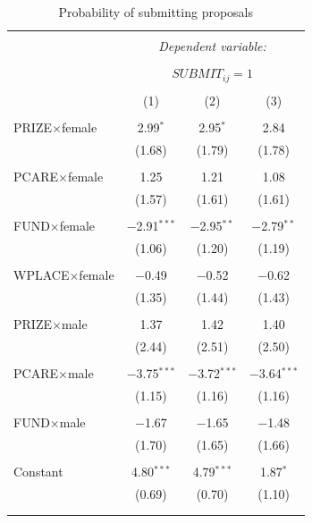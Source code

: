\documentclass[12pt, titlepage]{article}
\begin{document}
\begin{table}
\centering
\caption{Probability of submitting proposals}\label{tab: probability submitting interactions}
\begin{tabular}{@{\extracolsep{5pt}}lccc} 
\\[-1.8ex]\hline 
\hline \\[-1.8ex] 
 & \multicolumn{3}{c}{\textit{Dependent variable:}} \\ 
\cline{2-4} 
\\[-1.8ex] & \multicolumn{3}{c}{ $SUBMIT_{ij}=1$ } \\ 
\\[-1.8ex] & (1) & (2) & (3)\\ 
\hline \\[-1.8ex] 
 PRIZE$\times$female & 2.99$^{*}$ & 2.95$^{*}$ & 2.84 \\ 
  & (1.68) & (1.79) & (1.78) \\ 
  & & & \\ 
 PCARE$\times$female & 1.25 & 1.21 & 1.08 \\ 
  & (1.57) & (1.61) & (1.61) \\ 
  & & & \\ 
 FUND$\times$female & $-$2.91$^{***}$ & $-$2.95$^{**}$ & $-$2.79$^{**}$ \\ 
  & (1.06) & (1.20) & (1.19) \\ 
  & & & \\ 
 WPLACE$\times$female & $-$0.49 & $-$0.52 & $-$0.62 \\ 
  & (1.35) & (1.44) & (1.43) \\ 
  & & & \\ 
 PRIZE$\times$male & 1.37 & 1.42 & 1.40 \\ 
  & (2.44) & (2.51) & (2.50) \\ 
  & & & \\ 
 PCARE$\times$male & $-$3.75$^{***}$ & $-$3.72$^{***}$ & $-$3.64$^{***}$ \\ 
  & (1.15) & (1.16) & (1.16) \\ 
  & & & \\ 
 FUND$\times$male & $-$1.67 & $-$1.65 & $-$1.48 \\ 
  & (1.70) & (1.65) & (1.66) \\ 
  & & & \\ 
 Constant & 4.80$^{***}$ & 4.79$^{***}$ & 1.87$^{*}$ \\ 
  & (0.69) & (0.70) & (1.10) \\ 
  & & & \\ 
\hline \\[-1.8ex] 

\end{tabular}
\end{table}
\end{document}
